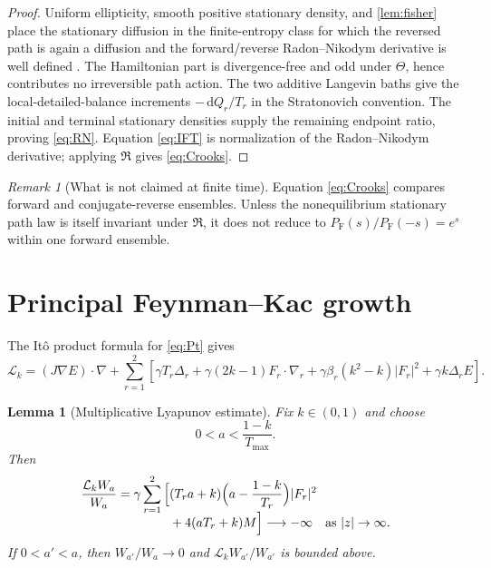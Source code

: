 \documentclass[11pt]{article}
\newtheorem{lemma}[theorem]{Lemma}
\theoremstyle{remark}
\newtheorem{remark}[theorem]{Remark}
\newcommand{\dd}{\,\mathrm d}
\newcommand{\cL}{\mathcal L}
\begin{document}
\begin{proof}
Uniform ellipticity, smooth positive stationary density, and
\cref{lem:fisher} place the stationary diffusion in the finite-entropy class
for which the reversed path is again a diffusion and the forward/reverse
Radon--Nikodym derivative is well defined
\cite{HaussmannPardoux1986,ChetriteGawedzki2008}.  The Hamiltonian part is
divergence-free and odd under $\Theta$, hence contributes no irreversible
path action.  The two additive Langevin baths give the local-detailed-balance
increments $-\dd Q_r/T_r$ in the Stratonovich convention.  The initial and
terminal stationary densities supply the remaining endpoint ratio, proving
\eqref{eq:RN}.  Equation \eqref{eq:IFT} is normalization of the
Radon--Nikodym derivative; applying $\mathfrak R$ gives \eqref{eq:Crooks}.
\end{proof}

\begin{remark}[What is not claimed at finite time]
Equation \eqref{eq:Crooks} compares forward and conjugate-reverse ensembles.
Unless the nonequilibrium stationary path law is itself invariant under
$\mathfrak R$, it does not reduce to
$P_{\mathrm F}(s)/P_{\mathrm F}(-s)=e^s$ within one forward ensemble.
\end{remark}

\section{Principal Feynman--Kac growth}

The It\^o product formula for \eqref{eq:Pt} gives
\begin{equation}\label{eq:Lk}
 \cL_k=(J\nabla E)\cdot\nabla
 +\sum_{r=1}^2\left[
 \gamma T_r\Delta_r+\gamma(2k-1)F_r\cdot\nabla_r
 +\gamma\beta_r(k^2-k)|F_r|^2+\gamma k\Delta_rE
 \right].
\end{equation}

\begin{lemma}[Multiplicative Lyapunov estimate]\label{lem:tilted-lyap}
Fix $k\in(0,1)$ and choose
\begin{equation}\label{eq:a-range}
 0<a<\frac{1-k}{T_{\max}}.
\end{equation}
Then
\begin{align}
 \frac{\cL_kW_a}{W_a}
 =\gamma\sum_{r=1}^2\Big[&
 (T_ra+k)\Big(a-\frac{1-k}{T_r}\Big)|F_r|^2
 \notag\\[-2mm]
 &+4(aT_r+k)M\Big]
 \longrightarrow-\infty
 \quad\text{as }|z|\to\infty.\label{eq:tilted-drift}
\end{align}
If $0<a'<a$, then $W_{a'}/W_a\to0$ and
$\cL_kW_{a'}/W_{a'}$ is bounded above.
\end{lemma}
\end{document}
